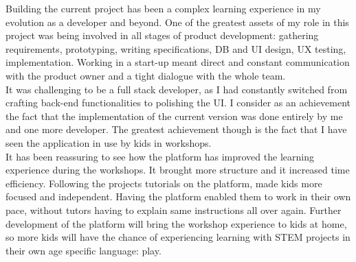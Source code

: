 Building the current project has been a complex learning experience in my evolution as a developer and beyond. 
One of the greatest assets of my role in this project was being involved in all stages of product development: gathering requirements, prototyping, writing specifications, DB and UI design, UX testing, implementation. Working in a start-up meant direct and constant communication with the product owner and a tight dialogue with the whole team. \\

It was challenging to be a full stack developer, as I had constantly switched from crafting back-end functionalities to polishing the UI. I consider as an achievement the fact that the implementation of the current version was done entirely by me and one more developer. The greatest achievement though is the fact that I have seen the application in use by kids in workshops. \\

It has been reassuring to see how the platform has improved the learning experience during the workshops. It brought more structure and it increased time efficiency. Following the projects tutorials on the platform, made kids more focused and independent. Having the platform enabled them to work in their own pace, without tutors having to explain same instructions all over again. Further development of the platform will bring the workshop experience to kids at home, so more kids will have the chance of experiencing learning with STEM projects in their own age specific language: play.\\


